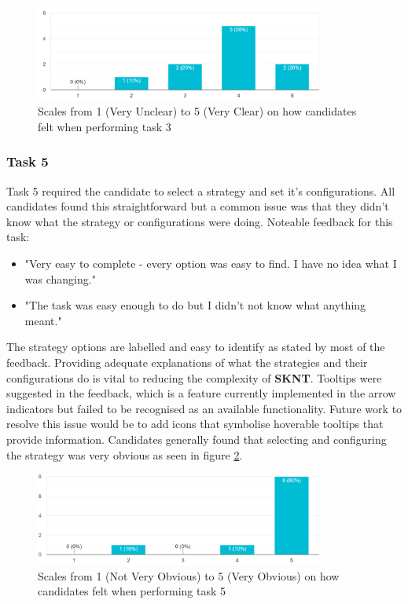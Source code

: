 \begin{figure}[ht]
  \centering
 \includegraphics[width=0.85\textwidth]{content/graphics/task3_clarity.PNG}
  \caption{Scales from 1 (Very Unclear) to 5 (Very Clear) on how candidates felt when performing task 3}
  \label{fig:eval:web_app:task3_clarity}
\end{figure}


\subsubsection{Task 5}
\label{sec:evaluation:ui:tasks:q5}
Task 5 required the candidate to select a strategy and set it's configurations. All candidates found this straightforward but a common issue was that they didn't know what the strategy or configurations were doing. Noteable feedback for this task:
\begin{itemize}
\item "Very easy to complete - every option was easy to find. I have no idea what I was changing."
\item "The task was easy enough to do but I didn't not know what anything meant."
\end{itemize}
The strategy options are labelled and easy to identify as stated by most of the feedback. Providing adequate explanations of what the strategies and their configurations do is vital to reducing the complexity of \textbf{SKNT}. Tooltips were suggested in the feedback, which is a feature currently implemented in the arrow indicators but failed to be recognised as an available functionality. Future work to resolve this issue would be to add icons that symbolise hoverable tooltips that provide information. Candidates generally found that selecting and configuring the strategy was very obvious as seen in figure \ref{fig:eval:web_app:task5_obvious}.

\begin{figure}[ht]
  \centering
 \includegraphics[width=0.85\textwidth]{content/graphics/task5_obvious.PNG}
  \caption{Scales from 1 (Not Very Obvious) to 5 (Very Obvious) on how candidates felt when performing task 5}
  \label{fig:eval:web_app:task5_obvious}
\end{figure}

